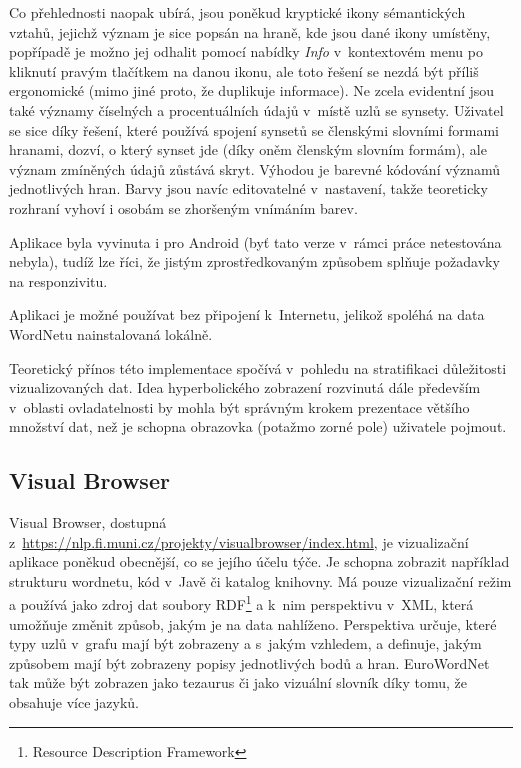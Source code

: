 \documentclass[a4paper,11pt,openany,twoside]{book}
\begin{document}
					Co přehlednosti naopak ubírá, jsou poněkud kryptické ikony sémantických vztahů, jejichž význam je sice popsán na hraně, kde jsou dané ikony umístěny, popřípadě je možno jej odhalit pomocí nabídky \textit{Info} v~kontextovém menu po kliknutí pravým tlačítkem na danou ikonu, ale toto řešení se nezdá být příliš ergonomické (mimo jiné proto, že duplikuje informace). Ne zcela evidentní jsou také významy číselných a procentuálních údajů v~místě uzlů se synsety. Uživatel se sice díky řešení, které používá spojení synsetů se členskými slovními formami hranami, dozví, o který synset jde (díky oněm členským slovním formám), ale význam zmíněných údajů zůstává skryt. Výhodou je barevné kódování významů jednotlivých hran. Barvy jsou navíc editovatelné v~nastavení, takže teoreticky rozhraní vyhoví i osobám se zhoršeným vnímáním barev.

					Aplikace byla vyvinuta i pro Android (byť tato verze v~rámci práce netestována nebyla), tudíž lze říci, že jistým zprostředkovaným způsobem splňuje požadavky na responzivitu.

					Aplikaci je možné používat bez připojení k~Internetu, jelikož spoléhá na data WordNetu nainstalovaná lokálně.

					Teoretický přínos této implementace spočívá v~pohledu na stratifikaci důležitosti vizualizovaných dat. Idea hyperbolického zobrazení rozvinutá dále především v~oblasti ovladatelnosti by mohla být správným krokem prezentace většího množství dat, než je schopna obrazovka (potažmo zorné pole) uživatele pojmout.

				\subsection{Visual Browser}

					Visual Browser, dostupná z~\url{https://nlp.fi.muni.cz/projekty/visualbrowser/index.html}, je vizualizační aplikace poněkud obecnější, co se jejího účelu týče. Je schopna zobrazit například strukturu wordnetu, kód v~Javě či katalog knihovny. Má pouze vizualizační režim a používá jako zdroj dat soubory RDF\footnote{Resource Description Framework} a k~nim perspektivu v~XML, která umožňuje změnit způsob, jakým je na data nahlíženo. Perspektiva určuje, které typy uzlů v~grafu mají být zobrazeny a s~jakým vzhledem, a definuje, jakým způsobem mají být zobrazeny popisy jednotlivých bodů a hran. EuroWordNet tak může být zobrazen jako tezaurus či jako vizuální slovník díky tomu, že obsahuje více jazyků. \parencite{visualbrowser595310} 
\end{document}
